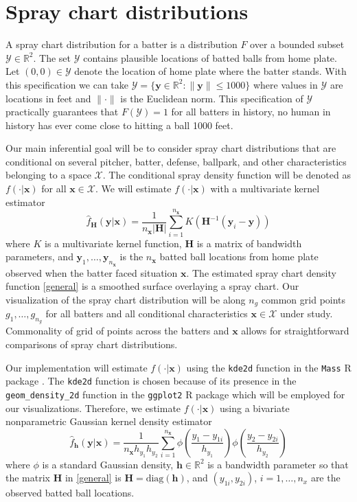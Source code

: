\documentclass[11pt]{article}
\newcommand{\R}{\mathbb{R}}
\newcommand{\Y}{\mathcal{Y}}
\newcommand{\X}{\mathcal{X}}
\newcommand{\Hbf}{\textbf{H}}
\newcommand{\y}{\textbf{y}}
\newcommand{\x}{\textbf{x}}
\newcommand{\h}{\textbf{h}}
\begin{document}
\section{Spray chart distributions}

A spray chart distribution for a batter is a distribution $F$ over a bounded subset $\Y \in \R^2$. The set $\Y$ contains plausible locations of batted balls from home plate. Let $(0,0) \in \Y$ denote the location of home plate where the batter stands. With this specification we can take $\Y = \{\y \in \R^2: \|\y\| \leq 1000\}$ where values in $\Y$ are locations in feet and $\|\cdot\|$ is the Euclidean norm. This specification of $\Y$ practically guarantees that $F(\Y) = 1$ for all batters in history, no human in history has ever come close to hitting a ball 1000 feet.

Our main inferential goal will be to consider spray chart distributions that are conditional on several pitcher, batter, defense, ballpark, and other characteristics belonging to a space $\X$. 
The conditional spray density function will be denoted as $f(\cdot|\x)$ for all $\x \in \X$.
We will estimate $f(\cdot|\x)$ with a multivariate kernel estimator
\begin{equation} \label{general}
  \hat f_\Hbf(\y|\x) = \frac{1}{n_\x|\Hbf|}\sum_{i=1}^{n_\x} K\left(\Hbf^{-1}(\y_i - \y)\right)
\end{equation}
where $K$ is a multivariate kernel function, $\Hbf$ is a matrix of bandwidth parameters, and 
$\y_1,\ldots,\y_{n_\x}$ is the $n_\x$ batted ball locations from home plate observed when the batter faced situation $\x$. The estimated spray chart density function \eqref{general} is a smoothed surface overlaying a spray chart. Our visualization of the spray chart distribution will be along $n_g$ common grid points $g_1,\ldots,g_{n_g}$ for all batters and all conditional characteristics $\x \in \X$ under study. Commonality of grid of points across the batters and $\x$ allows for straightforward comparisons of spray chart distributions.

Our implementation will estimate $f(\cdot|\x)$ using the \texttt{kde2d} function in the \texttt{Mass} R package \citep{MASS}. The \texttt{kde2d} function is chosen because of its presence in the \texttt{geom\_density\_2d} function in the \texttt{ggplot2} R package \citep{ggplot2} which will be employed for our visualizations. Therefore, we estimate $f(\cdot|\x)$ using a bivariate nonparametric Gaussian kernel density estimator
\begin{equation} \label{spraydens}
  \hat f_\h(\y|\x) = 
    \frac{1}{n_\x h_{y_1}h_{y_2}}\sum_{i=1}^{n_\x} \phi\left(\frac{y_1 - y_{1i}}{h_{y_1}}\right)
      \phi\left(\frac{y_2 - y_{2i}}{h_{y_2}}\right)
\end{equation}
where $\phi$ is a standard Gaussian density, $\h \in \R^2$ is a bandwidth parameter so that the matrix $\Hbf$ in \eqref{general} is $\Hbf = \text{diag}(\h)$, and $(y_{1i},y_{2i})$, $i = 1,\ldots,n_x$ are the observed batted ball locations. 
\end{document}
